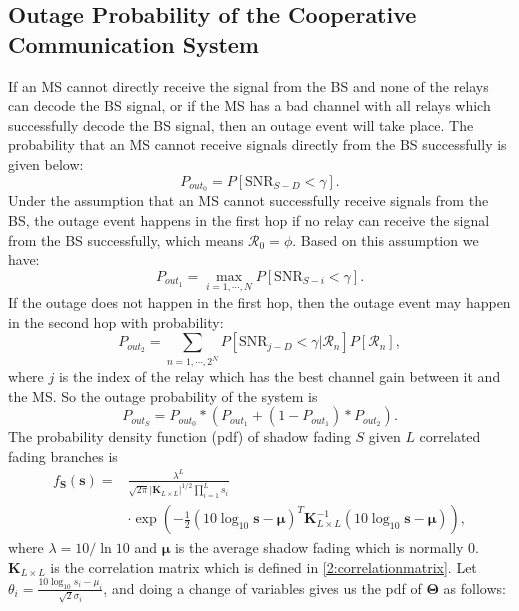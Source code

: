 \subsection{Outage Probability of the Cooperative Communication System}
\label{outageprobability}
 If an MS cannot directly receive the signal from the BS and none of the relays can decode the BS signal, or if the MS has a bad channel with all relays which successfully decode the BS signal, then an outage event will take place. The probability that an MS cannot receive signals directly from the BS successfully is given below:
\begin{equation}
P_{out_{0}} = P[\text{SNR}_{S-D}<\gamma].
\end{equation}
Under the assumption that an MS cannot successfully receive signals from the BS, the outage event happens in the first hop if no relay can receive the signal from the BS successfully, which means $\mathcal{R}_{0}=\phi$. Based on this assumption we have:
\begin{equation}
P_{out_{1}} = \max_{i = 1,\cdots,N} P[\text{SNR}_{S-i}<\gamma].
\end{equation}
If the outage does not happen in the first hop, then the outage event may happen in the second hop with probability:
\begin{equation}
P_{out_{2}} = \sum_{n=1,\cdots,2^{N}}P[\text{SNR}_{j-D}<\gamma|\mathcal{R}_{n}]P[\mathcal{R}_{n}],
\end{equation}
where $j$ is the index of the relay which has the best channel gain between it and the MS.
So the outage probability of the system is
\begin{equation}
P_{out_{S}} = P_{out_{0}}*(P_{out_{1}}+(1-P_{out_{1}})*P_{out_{2}}).
\end{equation}
The probability density function (pdf) of shadow fading $S$ given $L$ correlated fading branches is
\begin{equation}
\begin{split}
f_{\mathbf{S}}(\mathbf{s}) = &\frac{\lambda^{L}}{\sqrt{2\pi}|\mathbf{K}_{L\times L}|^{1/2}\prod_{i=1}^{L}s_{i}}\\
&\cdot\exp(-\frac{1}{2}(10\log_{10}\mathbf{s}-\boldsymbol{\mu})^{T}\mathbf{K}_{L\times L}^{-1}(10\log_{10}\mathbf{s}-\boldsymbol{\mu})),
\end{split}
\end{equation}
where $\lambda = 10/\ln10$ and $\boldsymbol{\mu}$ is the average shadow fading which is normally $0$. $\mathbf{K}_{L\times L}$ is the correlation matrix which is defined in \eqref{2:correlationmatrix}. Let $\theta_{i} = \frac{10\log_{10}s_{i}-\mu_{i}}{\sqrt{2}\sigma_{i}}$, and doing a change of variables gives us the pdf of $\mathbf{\Theta}$ as follows:
